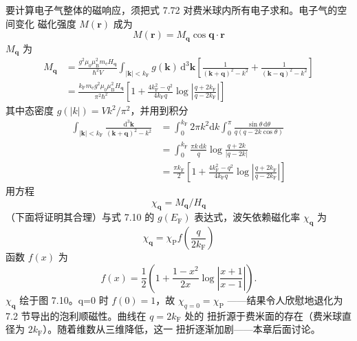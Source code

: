 要计算电子气整体的磁响应，须把式 7.72 对费米球内所有电子求和。电子气的空间变化
磁化强度 $M(\mathbf{r})$ 成为
\begin{equation*}
M(\mathbf{r}) = M_{\mathbf{q}}\cos\mathbf{q}\cdot\mathbf{r}\tag{7.73}
\end{equation*}
$M_{\mathbf{q}}$ 为
\begin{align*}
M_{\mathbf{q}} &= \frac{g^{2}\mu_0\mu_{\mathrm{B}}^{2}m_{\mathrm{e}}H_{\mathbf{q}}}{\hbar^{2}V}\int_{|\mathbf{k}|<k_{\mathrm{F}}}g(\mathbf{k})\,\mathrm{d}^{3}\mathbf{k}\left[\frac{1}{(\mathbf{k}+\mathbf{q})^{2}-k^{2}} + \frac{1}{(\mathbf{k}-\mathbf{q})^{2}-k^{2}}\right]\tag{7.74}\\
&= \frac{k_{\mathrm{F}}m_{\mathrm{e}}g^{2}\mu_0\mu_{\mathrm{B}}^{2}H_{\mathbf{q}}}{\pi^{2}\hbar^{2}}\left[1+\frac{4k_{\mathrm{F}}^{2}-q^{2}}{4k_{\mathrm{F}}q}\log\left|\frac{q+2k_{\mathrm{F}}}{q-2k_{\mathrm{F}}}\right|\right]\tag{7.75}
\end{align*}
其中态密度 $g(|k|)=Vk^{2}/\pi^{2}$，并用到积分
\begin{align*}
\int_{|\mathbf{k}|<k_{\mathrm{F}}}\frac{\mathrm{d}^{3}\mathbf{k}}{(\mathbf{k}+\mathbf{q})^{2}-k^{2}} &= \int_{0}^{k_{\mathrm{F}}}2\pi k^{2}\mathrm{d}k\int_{0}^{\pi}\frac{\sin\theta\,\mathrm{d}\theta}{q(q-2k\cos\theta)}\\
&= \int_{0}^{k_{\mathrm{F}}}\frac{\pi k\,\mathrm{d}k}{q}\log\frac{q+2k}{|q-2k|}\\
&= \frac{\pi k_{\mathrm{F}}}{2}\left[1+\frac{4k_{\mathrm{F}}^{2}-q^{2}}{4k_{\mathrm{F}}q}\log\left|\frac{q+2k_{\mathrm{F}}}{q-2k_{\mathrm{F}}}\right|\right]\tag{7.76}
\end{align*}
用方程
\begin{equation*}
\chi_{\mathbf{q}} = M_{\mathbf{q}}/H_{\mathbf{q}}\tag{7.77}
\end{equation*}
（下面将证明其合理）与式 7.10 的 $g(E_{\mathrm{F}})$ 表达式，波矢依赖磁化率
$\chi_{\mathbf{q}}$ 为
\begin{equation*}
\chi_{\mathbf{q}} = \chi_{\mathrm{P}}f\left(\frac{q}{2k_{\mathrm{F}}}\right)\tag{7.78}
\end{equation*}
函数 $f(x)$ 为
\begin{equation*}
f(x) = \frac{1}{2}\left(1+\frac{1-x^{2}}{2x}\log\left|\frac{x+1}{x-1}\right|\right).\tag{7.79}
\end{equation*}
$\chi_{\mathbf{q}}$ 绘于图 7.10。q=0 时 $f(0)=1$，故 $\chi_{q=0}=\chi_{\mathrm{P}}$
——结果令人欣慰地退化为 7.2 节导出的泡利顺磁性。曲线在 $q=2k_{\mathrm{F}}$ 处的
扭折源于费米面的存在（费米球直径为 $2k_{\mathrm{F}}$）。随着维数从三维降低，这一
扭折逐渐加剧——本章后面讨论。

